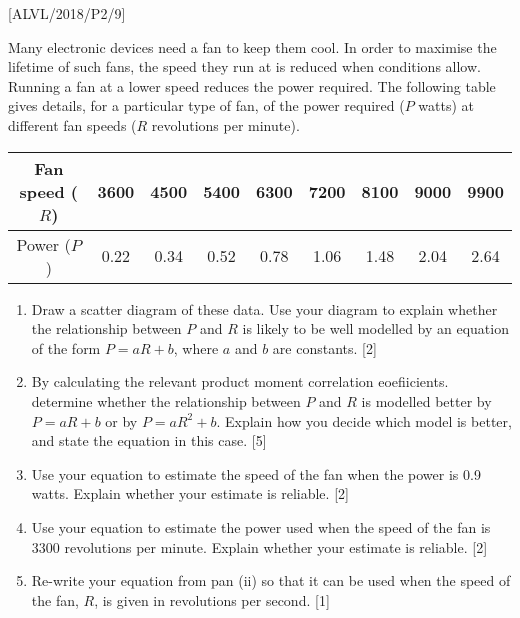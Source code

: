 \item {[}ALVL/2018/P2/9{]}

Many electronic devices need a fan to keep them cool. In order to
maximise the lifetime of such fans, the speed they run at is reduced
when conditions allow. Running a fan at a lower speed reduces the
power required. The following table gives details, for a particular
type of fan, of the power required ($P$ watts) at different fan speeds
($R$ revolutions per minute).
\noindent \begin{center}
\begin{tabular}{|c|c|c|c|c|c|c|c|c|}
\hline 
Fan speed ($R$) & 3600 & 4500 & 5400 & 6300 & 7200 & 8100 & 9000 & 9900\tabularnewline
\hline 
Power ($P$) & 0.22 & 0.34 & 0.52 & 0.78 & 1.06 & 1.48 & 2.04 & 2.64\tabularnewline
\hline 
\end{tabular} 
\par\end{center}
\begin{enumerate}
\item Draw a scatter diagram of these data. Use your diagram to explain
whether the relationship between $P$ and $R$ is likely to be well
modelled by an equation of the form $P=aR+b$, where $a$ and $b$
are constants.\hfill{} {[}2{]}
\item By calculating the relevant product moment correlation eoefiicients.
determine whether the relationship between $P$ and $R$ is modelled
better by $P=aR+b$ or by $P=aR^{2}+b$. Explain how you decide which
model is better, and state the equation in this case.\hfill{} {[}5{]}
\item Use your equation to estimate the speed of the fan when the power
is 0.9 watts. Explain whether your estimate is reliable.\hfill{}
{[}2{]}
\item Use your equation to estimate the power used when the speed of the
fan is 3300 revolutions per minute. Explain whether your estimate
is reliable. \hfill{}{[}2{]}
\item Re-write your equation from pan (ii) so that it can be used when the
speed of the fan, $R$, is given in revolutions per second. \hfill{}{[}1{]}
\end{enumerate}
